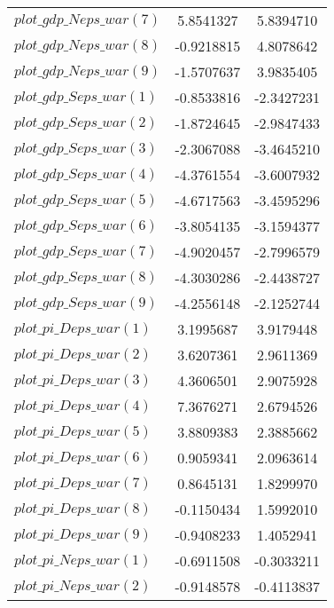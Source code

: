 \begin{center}
\begin{longtable}{lcc}
$plot\_gdp\_N eps\_war (7)  $	 & 	      5.8541327	 & 	      5.8394710 \\ 
$plot\_gdp\_N eps\_war (8)  $	 & 	     -0.9218815	 & 	      4.8078642 \\ 
$plot\_gdp\_N eps\_war (9)  $	 & 	     -1.5707637	 & 	      3.9835405 \\ 
$plot\_gdp\_S eps\_war (1)  $	 & 	     -0.8533816	 & 	     -2.3427231 \\ 
$plot\_gdp\_S eps\_war (2)  $	 & 	     -1.8724645	 & 	     -2.9847433 \\ 
$plot\_gdp\_S eps\_war (3)  $	 & 	     -2.3067088	 & 	     -3.4645210 \\ 
$plot\_gdp\_S eps\_war (4)  $	 & 	     -4.3761554	 & 	     -3.6007932 \\ 
$plot\_gdp\_S eps\_war (5)  $	 & 	     -4.6717563	 & 	     -3.4595296 \\ 
$plot\_gdp\_S eps\_war (6)  $	 & 	     -3.8054135	 & 	     -3.1594377 \\ 
$plot\_gdp\_S eps\_war (7)  $	 & 	     -4.9020457	 & 	     -2.7996579 \\ 
$plot\_gdp\_S eps\_war (8)  $	 & 	     -4.3030286	 & 	     -2.4438727 \\ 
$plot\_gdp\_S eps\_war (9)  $	 & 	     -4.2556148	 & 	     -2.1252744 \\ 
$plot\_pi\_D eps\_war (1)   $	 & 	      3.1995687	 & 	      3.9179448 \\ 
$plot\_pi\_D eps\_war (2)   $	 & 	      3.6207361	 & 	      2.9611369 \\ 
$plot\_pi\_D eps\_war (3)   $	 & 	      4.3606501	 & 	      2.9075928 \\ 
$plot\_pi\_D eps\_war (4)   $	 & 	      7.3676271	 & 	      2.6794526 \\ 
$plot\_pi\_D eps\_war (5)   $	 & 	      3.8809383	 & 	      2.3885662 \\ 
$plot\_pi\_D eps\_war (6)   $	 & 	      0.9059341	 & 	      2.0963614 \\ 
$plot\_pi\_D eps\_war (7)   $	 & 	      0.8645131	 & 	      1.8299970 \\ 
$plot\_pi\_D eps\_war (8)   $	 & 	     -0.1150434	 & 	      1.5992010 \\ 
$plot\_pi\_D eps\_war (9)   $	 & 	     -0.9408233	 & 	      1.4052941 \\ 
$plot\_pi\_N eps\_war (1)   $	 & 	     -0.6911508	 & 	     -0.3033211 \\ 
$plot\_pi\_N eps\_war (2)   $	 & 	     -0.9148578	 & 	     -0.4113837 \\ 

\end{longtable}
\end{center}
